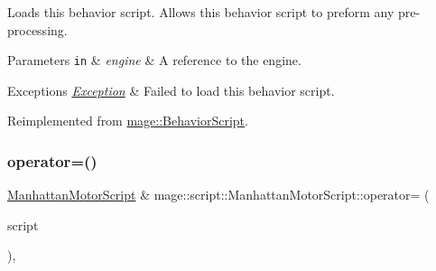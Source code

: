 Loads this behavior script. Allows this behavior script to preform any pre-\/processing.


\begin{DoxyParams}[1]{Parameters}
\mbox{\tt in}  & {\em engine} & A reference to the engine. \\
\hline
\end{DoxyParams}

\begin{DoxyExceptions}{Exceptions}
{\em \hyperlink{classmage_1_1_exception}{Exception}} & Failed to load this behavior script. \\
\hline
\end{DoxyExceptions}


Reimplemented from \hyperlink{classmage_1_1_behavior_script_ae7864876b2ffb1d1d8d8a56e3099f1f2}{mage\+::\+Behavior\+Script}.

\hypertarget{classmage_1_1script_1_1_manhattan_motor_script_a1c4dc4ffae903942248c7f744b0d019f}{}\label{classmage_1_1script_1_1_manhattan_motor_script_a1c4dc4ffae903942248c7f744b0d019f} 
\subsubsection{\texorpdfstring{operator=()}{operator=()}\hspace{0.1cm}{\footnotesize\ttfamily [1/2]}}
{\footnotesize\ttfamily \hyperlink{classmage_1_1script_1_1_manhattan_motor_script}{Manhattan\+Motor\+Script} \& mage\+::script\+::\+Manhattan\+Motor\+Script\+::operator= (\begin{DoxyParamCaption}\item[{const \hyperlink{classmage_1_1script_1_1_manhattan_motor_script}{Manhattan\+Motor\+Script} \&}]{script }\end{DoxyParamCaption})\hspace{0.3cm}{\ttfamily [default]}, {\ttfamily [noexcept]}}

\hypertarget{classmage_1_1script_1_1_manhattan_motor_script_a3184ea5b921fbdbd81173db3f7042a0c}{}\label{classmage_1_1script_1_1_manhattan_motor_script_a3184ea5b921fbdbd81173db3f7042a0c} 
